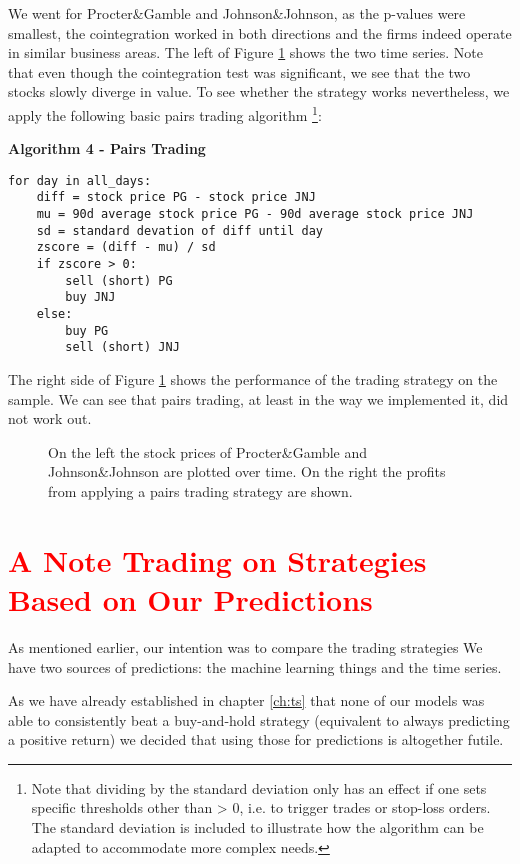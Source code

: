 We went for Procter\&Gamble and Johnson\&Johnson, as the p-values were smallest, the cointegration worked in both directions and the firms indeed operate in similar business areas. The left of Figure \ref{fig:coint_PG_JNJ} shows the two time series. Note that even though the cointegration test was significant, we see that the two stocks slowly diverge in value. To see whether the strategy works nevertheless, we apply the following basic pairs trading algorithm \footnote{Note that dividing by the standard deviation only has an effect if one sets specific thresholds other than > 0, i.e. to trigger trades or stop-loss orders. The standard deviation is included to illustrate how the algorithm can be adapted to accommodate more complex needs.}: 

\vspace{2ex}
\textbf{\small{Algorithm 4 - Pairs Trading}}
\vspace{-1ex}
\begin{verbatim}
for day in all_days: 
    diff = stock price PG - stock price JNJ
    mu = 90d average stock price PG - 90d average stock price JNJ
    sd = standard devation of diff until day
    zscore = (diff - mu) / sd
    if zscore > 0:
        sell (short) PG
        buy JNJ
    else:
        buy PG
        sell (short) JNJ
\end{verbatim}

The right side of Figure \ref{fig:coint_PG_JNJ} shows the performance of the trading strategy on the sample. We can see that pairs trading, at least in the way we implemented it, did not work out. 

\begin{figure}[h!]
    \centering
    \begin{adjustbox}{width=.95\textwidth,center}
        
        
    \end{adjustbox}  
    \caption{On the left the stock prices of Procter\&Gamble and Johnson\&Johnson are plotted over time. On the right the profits from applying a pairs trading strategy are shown.}
    \label{fig:coint_PG_JNJ}
\end{figure}{}

\section{\textcolor{red}{A Note Trading on Strategies Based on Our Predictions}}
As mentioned earlier, our intention was to compare the trading strategies 
We have two sources of predictions: the machine learning things and the time series. 

As we have already established in chapter \ref{ch:ts} that none of our models was able to consistently beat a buy-and-hold strategy (equivalent to always predicting a positive return) we decided that using those for predictions is altogether futile. 




